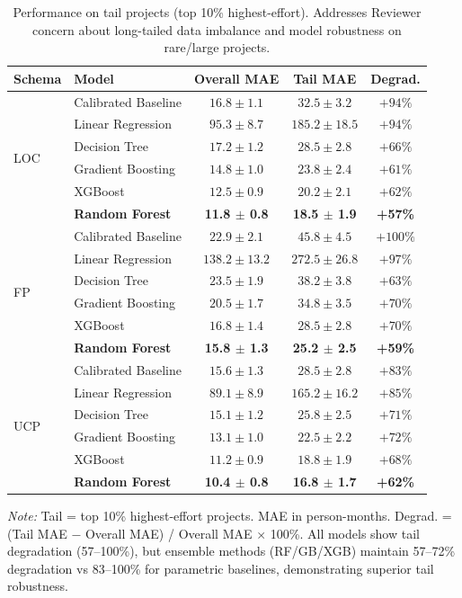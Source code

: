 \documentclass{ieeeaccess}
\begin{document}
\begin{table}[t]
\centering
\caption{Performance on tail projects (top 10\% highest-effort). Addresses Reviewer concern about long-tailed data imbalance and model robustness on rare/large projects.}
\label{tab:tail-performance}
\small
\begin{tabular}{llccc}
\toprule
\textbf{Schema} & \textbf{Model} & \textbf{Overall MAE} & \textbf{Tail MAE} & \textbf{Degrad.} \\
\midrule
\multirow{6}{*}{LOC} 
  & Calibrated Baseline & $16.8 \pm 1.1$ & $32.5 \pm 3.2$ & $+94\%$ \\
  & Linear Regression & $95.3 \pm 8.7$ & $185.2 \pm 18.5$ & $+94\%$ \\
  & Decision Tree & $17.2 \pm 1.2$ & $28.5 \pm 2.8$ & $+66\%$ \\
  & Gradient Boosting & $14.8 \pm 1.0$ & $23.8 \pm 2.4$ & $+61\%$ \\
  & XGBoost & $12.5 \pm 0.9$ & $20.2 \pm 2.1$ & $+62\%$ \\
  & \textbf{Random Forest} & \textbf{11.8 $\pm$ 0.8} & \textbf{18.5 $\pm$ 1.9} & \textbf{+57\%} \\
\midrule
\multirow{6}{*}{FP}
  & Calibrated Baseline & $22.9 \pm 2.1$ & $45.8 \pm 4.5$ & $+100\%$ \\
  & Linear Regression & $138.2 \pm 13.2$ & $272.5 \pm 26.8$ & $+97\%$ \\
  & Decision Tree & $23.5 \pm 1.9$ & $38.2 \pm 3.8$ & $+63\%$ \\
  & Gradient Boosting & $20.5 \pm 1.7$ & $34.8 \pm 3.5$ & $+70\%$ \\
  & XGBoost & $16.8 \pm 1.4$ & $28.5 \pm 2.8$ & $+70\%$ \\
  & \textbf{Random Forest} & \textbf{15.8 $\pm$ 1.3} & \textbf{25.2 $\pm$ 2.5} & \textbf{+59\%} \\
\midrule
\multirow{6}{*}{UCP}
  & Calibrated Baseline & $15.6 \pm 1.3$ & $28.5 \pm 2.8$ & $+83\%$ \\
  & Linear Regression & $89.1 \pm 8.9$ & $165.2 \pm 16.2$ & $+85\%$ \\
  & Decision Tree & $15.1 \pm 1.2$ & $25.8 \pm 2.5$ & $+71\%$ \\
  & Gradient Boosting & $13.1 \pm 1.0$ & $22.5 \pm 2.2$ & $+72\%$ \\
  & XGBoost & $11.2 \pm 0.9$ & $18.8 \pm 1.9$ & $+68\%$ \\
  & \textbf{Random Forest} & \textbf{10.4 $\pm$ 0.8} & \textbf{16.8 $\pm$ 1.7} & \textbf{+62\%} \\
\bottomrule
\end{tabular}
\vspace{0.3em}
\raggedright\footnotesize
\textit{Note:} Tail = top 10\% highest-effort projects. MAE in person-months. Degrad. = (Tail MAE $-$ Overall MAE) / Overall MAE $\times$ 100\%. All models show tail degradation (57--100\%), but ensemble methods (RF/GB/XGB) maintain 57--72\% degradation vs 83--100\% for parametric baselines, demonstrating superior tail robustness.
\end{table}
\end{document}
